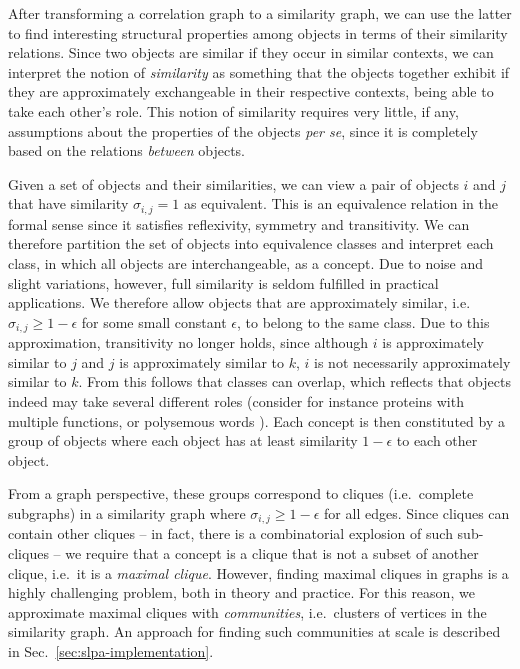 \documentclass{kais}
\begin{document}
After transforming a correlation graph to a similarity graph, we can use the latter to find interesting
structural properties among objects in terms of their similarity relations. Since two objects are similar
if they occur in similar contexts, we can interpret the notion of \emph{similarity} as something that
the objects together exhibit if they are approximately exchangeable in their respective contexts,
being able to take each other's role. This notion of similarity  
requires very little, if any, assumptions about the properties of the objects \emph{per se}, since it is 
completely based on the relations \emph{between} objects.

Given a set of objects and their similarities, we can view a pair of objects $i$ and $j$ that have similarity
$\sigma_{i,j} = 1$ as equivalent. This is an equivalence relation in the formal sense
since it satisfies reflexivity, symmetry and transitivity. We can therefore partition the set of objects into
equivalence classes and interpret each class, in which all objects are interchangeable, as a concept.
Due to noise and slight variations, however, full similarity is seldom fulfilled in practical applications.
We therefore allow objects that are approximately similar,
i.e.~$\sigma_{i,j} \geq 1-\epsilon$ for some small constant $\epsilon$,
to belong to the same class. Due to this approximation, transitivity no longer holds, since although $i$ is approximately
similar to $j$ and $j$ is approximately similar to $k$, $i$ is not necessarily approximately similar to $k$.
From this follows that classes can overlap, which reflects that objects indeed may take several different roles
(consider for instance proteins with multiple functions, or polysemous words \cite{Palla2005}). 
Each concept is then constituted by a group of objects where each object has at least similarity $1-\epsilon$ to each other object. 

From a graph perspective, these
groups correspond to cliques (i.e.~complete subgraphs) in a similarity graph where $\sigma_{i,j} \geq 1-\epsilon$
for all edges. Since cliques can contain other cliques -- in fact, there is a combinatorial
explosion of such sub-cliques -- we require that a concept is a clique that is not a subset of another clique,
i.e.~it is a \emph{maximal clique}. However, finding maximal cliques in graphs is a highly challenging problem, both in theory
and practice. 
For this reason,
we approximate maximal cliques with \emph{communities}, i.e.~clusters of vertices in the similarity graph. 
An approach for finding such communities at scale is described in Sec.~\ref{sec:slpa-implementation}.
\end{document}

